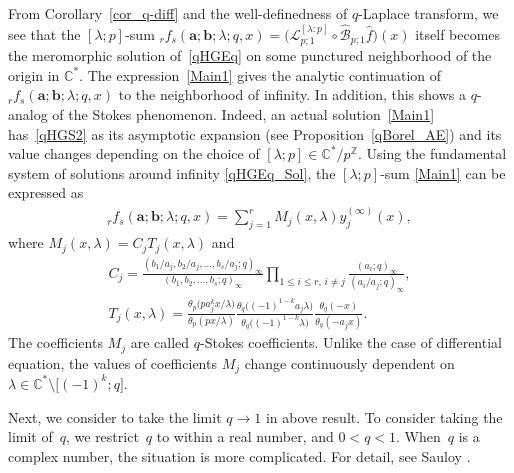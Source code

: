 \documentclass[pdftex]{sigma}
\numberwithin{equation}{section}
\begin{document}
From Corollary~\ref{cor_q-diff} and the well-definedness of $q$-Laplace transform, we see that the $[\lambda;p]$-sum ${}_rf_s(\bm{a};\bm{b};\lambda;q,x)=\big(\mathcal{L}_{p;1}^{[\lambda:p]}\circ\mathcal{\hat{B}}_{p;1}\hat{f}\big)(x)$ itself becomes the meromorphic solution of~\eqref{qHGEq} on some punctured neighborhood of the origin in $\mathbb{C}^*$. The expression~\eqref{Main1} gives the analytic continuation of ${}_rf_s(\bm{a};\bm{b};\lambda;q,x)$ to the neighborhood of infinity.
 In addition, this shows a $q$-analog of the Stokes phenomenon. Indeed, an actual solution~\eqref{Main1} has~\eqref{qHGS2} as its asymptotic expansion (see Proposition~\ref{qBorel_AE}) and its value changes depending on the choice of $[\lambda;p]\in\mathbb{C}^*/p^{\mathbb{Z}}$.
Using the fundamental system of solutions around infinity \eqref{qHGEq_Sol}, the $[\lambda;p]$-sum \eqref{Main1} can be expressed as
\begin{gather*}
{}_rf_s(\bm{a};\bm{b};\lambda;q,x)=\sum_{j=1}^r M_j(x,\lambda)y_j^{(\infty)}(x),
\end{gather*}
where $M_j(x,\lambda)=C_jT_j(x,\lambda)$ and
\begin{gather*}
C_j=\frac{(b_1/a_j,b_2/a_j,\ldots,b_s/a_j;q)_\infty}{(b_1,b_2,\ldots,b_s;q)_\infty}\prod_{1\le i\le r,\, i\neq j}\frac{(a_i;q)_\infty}{(a_i/a_j;q)_\infty},\\
T_j(x,\lambda)=\frac{\theta_{p}\big(pa_j^kx/\lambda\big)}{\theta_{p}(px/\lambda)}\frac{\theta_q\big((-1)^{1-k}a_j\lambda\big)}{\theta_q\big((-1)^{1-k}\lambda\big)}\frac{\theta_q(-x)}{\theta_q(-a_jx)}\label{T_j}.
\end{gather*}
The coefficients $M_j$ are called $q$-Stokes coefficients. Unlike the case of differential equation, the values of coefficients $M_j$ change continuously dependent on $\lambda\in\mathbb{C}^*\setminus\big[(-1)^k;q\big]$.

Next, we consider to take the limit $q\to1$ in above result. To consider taking the limit of~$q$, we restrict~$q$ to within a real number, and $0<q<1$. When~$q$ is a complex number, the situation is more complicated. For detail, see Sauloy \cite{Sauloy2000}.
\end{document}
